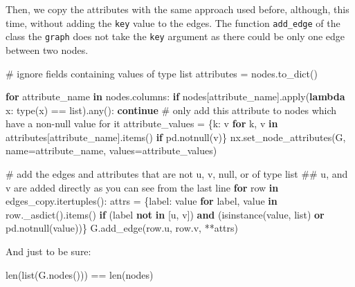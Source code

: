 \documentclass[
  letterpaper,
  DIV=11,
  numbers=noendperiod]{scrreprt}
\newenvironment{Shaded}{\begin{snugshade}}{\end{snugshade}}
\newcommand{\BuiltInTok}[1]{\textcolor[rgb]{0.00,0.23,0.31}{#1}}
\newcommand{\CommentTok}[1]{\textcolor[rgb]{0.37,0.37,0.37}{#1}}
\newcommand{\ControlFlowTok}[1]{\textcolor[rgb]{0.00,0.23,0.31}{\textbf{#1}}}
\newcommand{\KeywordTok}[1]{\textcolor[rgb]{0.00,0.23,0.31}{\textbf{#1}}}
\newcommand{\NormalTok}[1]{\textcolor[rgb]{0.00,0.23,0.31}{#1}}
\newcommand{\OperatorTok}[1]{\textcolor[rgb]{0.37,0.37,0.37}{#1}}
\newcommand{\StringTok}[1]{\textcolor[rgb]{0.13,0.47,0.30}{#1}}
\begin{document}
Then, we copy the attributes with the same approach used before,
although, this time, without adding the \texttt{key} value to the edges.
The function \texttt{add\_edge} of the class the \texttt{graph} does not
take the \texttt{key} argument as there could be only one edge between
two nodes.

\begin{Shaded}
\begin{Highlighting}[]
\CommentTok{\# ignore fields containing values of type list}
\NormalTok{attributes }\OperatorTok{=}\NormalTok{ nodes.to\_dict()}

\ControlFlowTok{for}\NormalTok{ attribute\_name }\KeywordTok{in}\NormalTok{ nodes.columns:}
    \ControlFlowTok{if}\NormalTok{ nodes[attribute\_name].}\BuiltInTok{apply}\NormalTok{(}\KeywordTok{lambda}\NormalTok{ x: }\BuiltInTok{type}\NormalTok{(x) }\OperatorTok{==} \BuiltInTok{list}\NormalTok{).}\BuiltInTok{any}\NormalTok{(): }
        \ControlFlowTok{continue}    
    \CommentTok{\# only add this attribute to nodes which have a non{-}null value for it}
\NormalTok{    attribute\_values }\OperatorTok{=}\NormalTok{ \{k: v }\ControlFlowTok{for}\NormalTok{ k, v }\KeywordTok{in}\NormalTok{ attributes[attribute\_name].items() }\ControlFlowTok{if}\NormalTok{ pd.notnull(v)\}}
\NormalTok{    nx.set\_node\_attributes(G, name}\OperatorTok{=}\NormalTok{attribute\_name, values}\OperatorTok{=}\NormalTok{attribute\_values)}

\CommentTok{\# add the edges and attributes that are not u, v, null, or of type list}
\CommentTok{\#\# u, and v are added directly as you can see from the last line}
\ControlFlowTok{for}\NormalTok{ row }\KeywordTok{in}\NormalTok{ edges\_copy.itertuples():}
\NormalTok{    attrs }\OperatorTok{=}\NormalTok{ \{label: value }\ControlFlowTok{for}\NormalTok{ label, value }\KeywordTok{in}\NormalTok{ row.\_asdict().items() }\ControlFlowTok{if}\NormalTok{ (label }\KeywordTok{not} \KeywordTok{in}\NormalTok{ [}\StringTok{\textquotesingle{}u\textquotesingle{}}\NormalTok{, }\StringTok{\textquotesingle{}v\textquotesingle{}}\NormalTok{]) }\KeywordTok{and}\NormalTok{ (}\BuiltInTok{isinstance}\NormalTok{(value, }\BuiltInTok{list}\NormalTok{) }\KeywordTok{or}\NormalTok{ pd.notnull(value))\}}
\NormalTok{    G.add\_edge(row.u, row.v, }\OperatorTok{**}\NormalTok{attrs)}
\end{Highlighting}
\end{Shaded}

And just to be sure:

\begin{Shaded}
\begin{Highlighting}[]
\BuiltInTok{len}\NormalTok{(}\BuiltInTok{list}\NormalTok{(G.nodes())) }\OperatorTok{==} \BuiltInTok{len}\NormalTok{(nodes)}
\end{Highlighting}
\end{Shaded}
\end{document}

